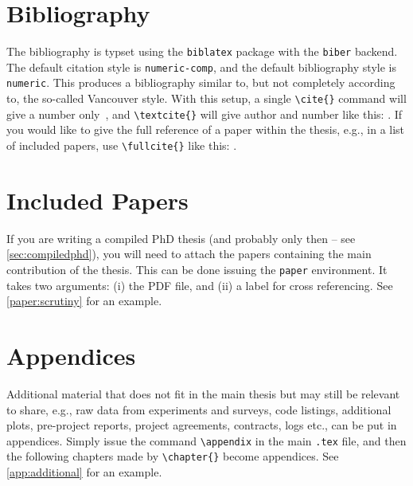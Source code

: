 \section{Bibliography}

The \gls{bibliography} is typset using the \texttt{biblatex} package with the \texttt{biber} backend. The default citation style is \texttt{numeric-comp}, and the default bibliography style is \texttt{numeric}. This produces a bibliography similar to, but not completely according to, the so-called Vancouver style. With this setup, a single \texttt{\textbackslash cite\{\}} command will give a number only~\cite{landes1951scrutiny}, and \texttt{\textbackslash textcite\{\}} will give author and number like this: \textcite{landes1951scrutiny}. If you would like to give the full reference of a paper within the thesis, e.g., in a list of included papers, use \texttt{\textbackslash fullcite\{\}} like this: .

\section{Included Papers}

If you are writing a compiled PhD thesis (and probably only then – see \cref{sec:compiledphd}), you will need to attach the papers containing the main contribution of the thesis. This can be done issuing the \texttt{paper} environment. It takes two arguments: (i) the PDF file, and (ii) a label for cross referencing. See \cref{paper:scrutiny} for an example.

\section{Appendices}

Additional material that does not fit in the main thesis but may still be relevant to share, e.g., raw data from experiments and surveys, code listings, additional plots, pre-project reports, project agreements, contracts, logs etc., can be put in appendices. Simply issue the command \texttt{\textbackslash appendix} in the main \texttt{.tex} file, and then the following chapters made by \texttt{\textbackslash chapter\{\}} become appendices. See \cref{app:additional} for an example.


\fi